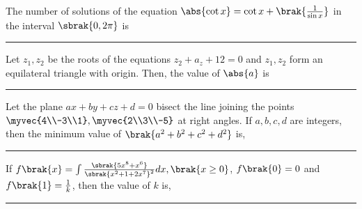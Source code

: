 	\item The number of solutions of the equation $\abs{\cot x}=\cot x +\brak{\frac{1}{\sin x}}$ in the interval $\sbrak{0, 2\pi}$ is\rule{2cm}{0.1pt}	\hfill {} 
	\item Let $z_1,z_2$ be the roots of the equations $z_2+a_z+12=0$ and $z_1,z_2$ form an equilateral triangle with origin. Then, the value of $\abs{a}$ is \rule{2cm}{0.1pt}	\hfill {} 
	\item Let the plane $ax+by+cz+d=0$ bisect the line joining the points $\myvec{4\\-3\\1},\myvec{2\\3\\-5}$ at right angles. If $a,b,c,d$ are integers, then the minimum value of $\brak{a^2+b^2+c^2+d^2}$ is,\rule{2cm}{0.1pt}	\hfill {} 
	\item If $f\brak{x}=\int\frac{\sbrak{5x^8+x^6}}{\sbrak{x^2+1+2x^7}^2}dx, \brak{x\ge0}$, $f\brak{0}=0$ and $f\brak{1}=\frac{1}{k}$, then the value of $k$ is, \rule{2cm}{0.1pt}	\hfill {} 
